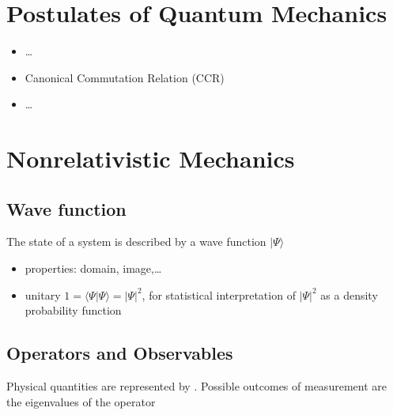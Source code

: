 \documentclass[letterpaper,10pt,english]{jupyterBook}
\begin{document}
\section{Postulates of Quantum Mechanics}
\label{\detokenize{ch/quantum-mechanics/intro:postulates-of-quantum-mechanics}}\label{\detokenize{ch/quantum-mechanics/intro:quantum-mechanics-intro-postulates}}\begin{itemize}
\item {} 
\sphinxAtStartPar
…

\item {} 
\sphinxAtStartPar
Canonical Commutation Relation (CCR) 

\item {} 
\sphinxAtStartPar
…

\end{itemize}


\section{Non\sphinxhyphen{}relativistic Mechanics}
\label{\detokenize{ch/quantum-mechanics/intro:non-relativistic-mechanics}}\label{\detokenize{ch/quantum-mechanics/intro:quantum-mechanics-intro-non-relativistic}}

\subsection{Wave function}
\label{\detokenize{ch/quantum-mechanics/intro:wave-function}}\label{\detokenize{ch/quantum-mechanics/intro:quantum-mechanics-intro-non-relativistic-wave-function}}
\sphinxAtStartPar
The state of a system is described by a wave function \(|\Psi\rangle\)

\sphinxAtStartPar
{}
\begin{itemize}
\item {} 
\sphinxAtStartPar
properties: domain, image,…

\item {} 
\sphinxAtStartPar
unitary \(1 = \langle \Psi | \Psi \rangle = \left| \Psi \right|^2\), for statistical interpretation of \(\left| \Psi \right|^2\) as a density probability function

\end{itemize}


\subsection{Operators and Observables}
\label{\detokenize{ch/quantum-mechanics/intro:operators-and-observables}}\label{\detokenize{ch/quantum-mechanics/intro:quantum-mechanics-intro-non-relativistic-observables-operators}}
\sphinxAtStartPar
Physical  quantities are represented by {\hyperref[\detokenize{ch/quantum-mechanics/intro:quantum-mechanics-math-operators-self-adjoint}]{}}. Possible outcomes of measurement are the eigenvalues of the operator
\end{document}
